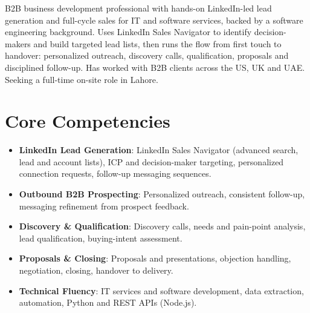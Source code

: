 \documentclass[11pt,a4paper,sans]{moderncv}
\begin{document}
\makecvtitle


\vspace{6pt}
\small{B2B business development professional with hands-on LinkedIn-led lead generation and full-cycle sales for IT and software services, backed by a software engineering background. Uses LinkedIn Sales Navigator to identify decision-makers and build targeted lead lists, then runs the flow from first touch to handover: personalized outreach, discovery calls, qualification, proposals and disciplined follow-up. Has worked with B2B clients across the US, UK and UAE. Seeking a full-time on-site role in Lahore.}


\section{Core Competencies}
\vspace{1pt}
\begin{itemize}

\item \textbf{LinkedIn Lead Generation}: LinkedIn Sales Navigator (advanced search, lead and account lists), ICP and decision-maker targeting, personalized connection requests, follow-up messaging sequences.

\item \textbf{Outbound B2B Prospecting}: Personalized outreach, consistent follow-up, messaging refinement from prospect feedback.

\item \textbf{Discovery \& Qualification}: Discovery calls, needs and pain-point analysis, lead qualification, buying-intent assessment.

\item \textbf{Proposals \& Closing}: Proposals and presentations, objection handling, negotiation, closing, handover to delivery.

\item \textbf{Technical Fluency}: IT services and software development, data extraction, automation, Python and REST APIs (Node.js).

\end{itemize}
\end{document}
